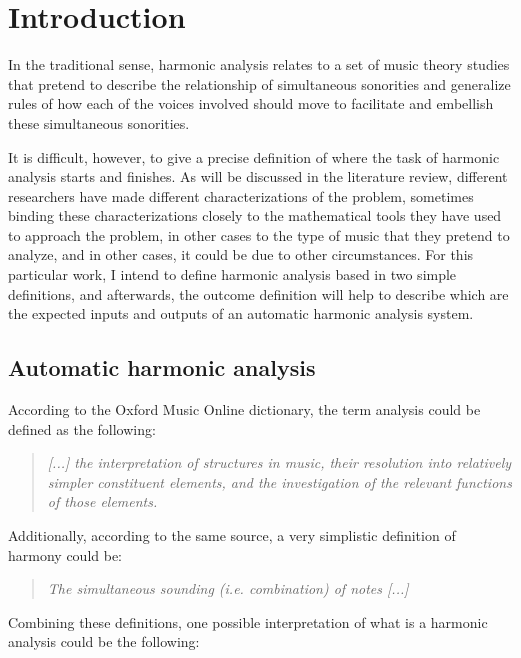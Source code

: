 \chapter{Introduction}
In the traditional sense, harmonic analysis relates to a set of music theory studies that pretend to describe the relationship of simultaneous sonorities and generalize rules of how each of the voices involved should move to facilitate and embellish these simultaneous sonorities.

It is difficult, however, to give a precise definition of where the task of harmonic analysis starts and finishes. As will be discussed in the literature review, different researchers have made different characterizations of the problem, sometimes binding these characterizations closely to the mathematical tools they have used to approach the problem, in other cases to the type of music that they pretend to analyze, and in other cases, it could be due to other circumstances. For this particular work, I intend to define harmonic analysis based in two simple definitions, and afterwards, the outcome definition will help to describe which are the expected inputs and outputs of an automatic harmonic analysis system.

\section{Automatic harmonic analysis}
According to the Oxford Music Online dictionary, the term analysis could be defined as the following: \cite{oxfordanalysis}

\begin{quote}
\centering
\emph{[...] the interpretation of structures in music, \linebreak
their resolution into relatively simpler constituent elements, \linebreak and the investigation of the relevant functions of those elements.}
\end{quote}

Additionally, according to the same source, a very simplistic definition of harmony could be: \cite{oxfordharmony}

\begin{quote}
\centering
\emph{The simultaneous sounding (i.e. combination) of notes [...]}
\end{quote}

Combining these definitions, one possible interpretation of what is a harmonic analysis could be the following:

